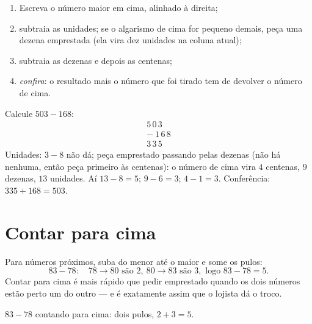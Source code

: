 \begin{method}\label{met:g2:subtraction:column}
\begin{enumerate}
  \item Escreva o número maior em cima, alinhado à direita;
  \item subtraia as unidades; se o algarismo de cima for pequeno
        demais, peça uma dezena emprestada (ela vira dez unidades na
        coluna atual);
  \item subtraia as dezenas e depois as centenas;
  \item \emph{confira}: o resultado mais o número que foi tirado tem
        de devolver o número de cima.
\end{enumerate}
\end{method}

\begin{example}\label{ex:g2:subtraction:worked}
Calcule $503 - 168$:
\[
\begin{array}{r}
5\,0\,3 \\
-\ 1\,6\,8 \\
\hline
3\,3\,5
\end{array}
\]
Unidades: $3 - 8$ não dá; peça emprestado passando pelas dezenas
(não há nenhuma, então peça primeiro às centenas): o número de cima
vira $4$ centenas, $9$ dezenas, $13$ unidades. Aí $13 - 8 = 5$;
$9 - 6 = 3$; $4 - 1 = 3$. Conferência: $335 + 168 = 503$.
\checkmark
\end{example}

\section{Contar para cima}

\begin{method}\label{met:g2:subtraction:countup}
Para números próximos, suba do menor até o maior e some os pulos:
\[
83 - 78: \quad 78 \to 80 \text{ são } 2, \ 80 \to 83 \text{ são } 3,
\text{ logo } 83 - 78 = 5 .
\]
Contar para cima é mais rápido que pedir emprestado quando os dois
números estão perto um do outro --- e é exatamente assim que o
lojista dá o troco.
\end{method}

\begin{omfigure}

{\small $83 - 78$ contando para cima: dois pulos, $2 + 3 = 5$.}
\end{omfigure}

